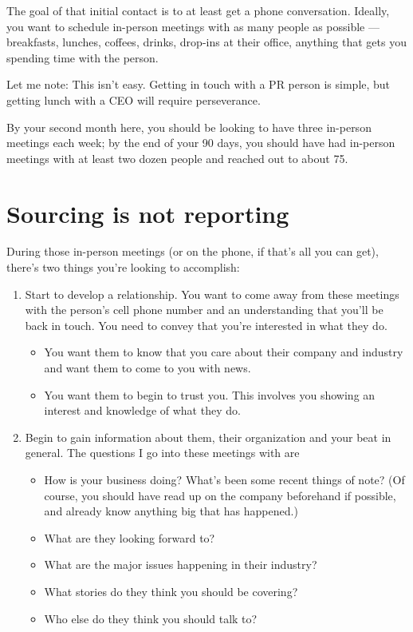 \documentclass[
  12pt,
  american,
  letterpaperpaper,
  extrafontsizes,onecolumn,openright
  ]{memoir}
\providecommand{\tightlist}{%
  \setlength{\itemsep}{0pt}\setlength{\parskip}{0pt}}
\begin{document}
The goal of that initial contact is to at least get a phone conversation. Ideally, you want to schedule in-person meetings with as many people as possible --- breakfasts, lunches, coffees, drinks, drop-ins at their office, anything that gets you spending time with the person.

Let me note: This isn't easy. Getting in touch with a PR person is simple, but getting lunch with a CEO will require perseverance.

By your second month here, you should be looking to have three in-person meetings each week; by the end of your 90 days, you should have had in-person meetings with at least two dozen people and reached out to about 75.

\hypertarget{sourcing-is-not-reporting}{%
\section*{Sourcing is not reporting}\label{sourcing-is-not-reporting}}

During those in-person meetings (or on the phone, if that's all you can get), there's two things you're looking to accomplish:

\begin{enumerate}
\def\labelenumi{\arabic{enumi}.}
\tightlist
\item
  Start to develop a relationship. You want to come away from these meetings with the person's cell phone number and an understanding that you'll be back in touch. You need to convey that you're interested in what they do.

  \begin{itemize}
  \tightlist
  \item
    You want them to know that you care about their company and industry and want them to come to you with news.
  \item
    You want them to begin to trust you. This involves you showing an interest and knowledge of what they do.
  \end{itemize}
\item
  Begin to gain information about them, their organization and your beat in general. The questions I go into these meetings with are

  \begin{itemize}
  \tightlist
  \item
    How is your business doing? What's been some recent things of note? (Of course, you should have read up on the company beforehand if possible, and already know anything big that has happened.)
  \item
    What are they looking forward to?
  \item
    What are the major issues happening in their industry?
  \item
    What stories do they think you should be covering?
  \item
    Who else do they think you should talk to?
  \end{itemize}
\end{enumerate}
\end{document}
